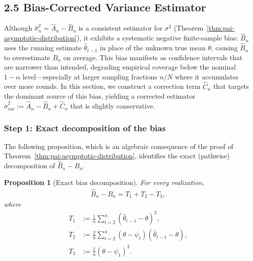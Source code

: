 \documentclass[11pt]{article}
\newtheorem{proposition}[theorem]{Proposition}
\newcommand{\thetahat}{\hat{\theta}}
\newcommand{\sigmahat}{\hat{\sigma}}
\newcommand{\Bhat}{\hat{B}}
\newcommand{\Ahat}{\hat{A}}
\newcommand{\Chat}{\hat{C}}
\begin{document}
\subsection*{2.5 \quad Bias-Corrected Variance Estimator}

Although $\sigmahat_n^2 = \Ahat_n - \Bhat_n$ is a consistent estimator for $\sigma^2$ (Theorem~\ref{thm:pai-asymptotic-distribution}), it exhibits a systematic negative finite-sample bias: $\Bhat_n$ uses the running estimate $\thetahat_{t-1}$ in place of the unknown true mean $\theta$, causing $\Bhat_n$ to overestimate $B_n$ on average. This bias manifests as confidence intervals that are narrower than intended, degrading empirical coverage below the nominal $1-\alpha$ level—especially at larger sampling fractions $n/N$ where it accumulates over more rounds. In this section, we construct a correction term $\Chat_n$ that targets the dominant source of this bias, yielding a corrected estimator $\sigmahat_{\mathrm{cor}}^2 := \Ahat_n - \Bhat_n + \Chat_n$ that is slightly conservative.

\subsubsection*{Step 1: Exact decomposition of the bias}

The following proposition, which is an algebraic consequence of the proof of Theorem~\ref{thm:pai-asymptotic-distribution}, identifies the exact (pathwise) decomposition of $\Bhat_n - B_n$.

\begin{proposition}[Exact bias decomposition]
\label{prop:bias-decomp}
    For every realization,
    \begin{align}
    \label{eq:bias-decomp}
        \Bhat_n - B_n = T_1 + T_2 - T_3,
    \end{align}
    where
    \begin{align}
        T_1 &:= \frac{1}{n}\sum_{t=2}^n \left( \thetahat_{t-1} - \theta \right)^2, \label{eq:T1} \\
        T_2 &:= \frac{2}{n}\sum_{t=2}^n \left( \theta - \psi_t \right)\left( \thetahat_{t-1} - \theta \right), \label{eq:T2} \\
        T_3 &:= \frac{1}{n}\left( \theta - \psi_1 \right)^2. \label{eq:T3}
    \end{align}
\end{proposition}
\end{document}
